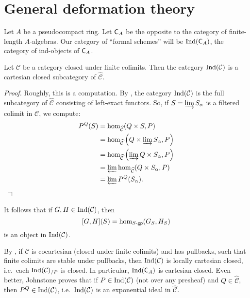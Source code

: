 \documentclass[phd,cornellheadings,draft]{cornell}
\begin{document}
\section{General deformation theory}

Let $A$ be a pseudocompact ring. Let $\mathsf{C}_A$ be the opposite to the 
category of finite-length $A$-algebras. Our category of ``formal schemes'' will 
be $\operatorname{Ind}(\mathsf{C}_A)$, the category of ind-objects of $\mathsf{C}_A$. 

\begin{theorem}
Let $\mathcal C$ be a category closed under finite colimits. Then the category 
$\operatorname{Ind}(\mathcal C)$ is a cartesian closed subcategory of 
$\widehat{\mathcal C}$. 
\end{theorem}
\begin{proof}
Roughly, this is a computation. By \cite[6.1.7]{kashiwara-schapira-2006}, the 
category $\operatorname{Ind}(\mathcal C)$ is the full subcategory of $\widehat{\mathcal C}$ 
consisting of left-exact functors. So, if $S=\varinjlim S_\alpha$ is a filtered 
colimit in $\mathcal C$, we compute:
\begin{align*}
	P^Q(S)
		&= \hom_{\widehat{\mathcal C}}(Q\times S,P) \\
		&= \hom_{\widehat{\mathcal C}}\left(Q\times \varinjlim S_\alpha,P\right) \\
		&= \hom_{\widehat{\mathcal C}}\left(\varinjlim Q\times S_\alpha,P\right) \\
		&= \varprojlim\hom_{\widehat{\mathcal C}}(Q\times S_\alpha,P) \\
		&= \varprojlim P^Q(S_\alpha) .
\end{align*}
\end{proof}

It follows that if $G,H\in \operatorname{Ind}(\mathcal C)$, then 
\[
  [G,H](S) = \hom_{S\textnormal{-}\mathsf{gp}}(G_S,H_S) 
\]
is an object in $\operatorname{Ind}(\mathcal C)$. 

By \cite[C 4.2.3]{johnstone-2002}, if $\mathcal C$ is cocartesian (closed under finite 
colimits) and has pullbacks, such that finite colimits are stable under pullbacks, 
then $\operatorname{Ind}(\mathcal C)$ is locally cartesian closed, i.e.~each 
$\operatorname{Ind}(\mathcal C)_{/P}$ is closed. In particular, 
$\operatorname{Ind}(\mathsf{C}_A)$ is cartesian closed. Even better, Johnstone proves that 
if $P\in \operatorname{Ind}(\mathcal C)$ (not over any presheaf) and $Q\in \widehat{\mathcal C}$,
then $P^Q\in\operatorname{Ind}(\mathcal C)$, i.e.~$\operatorname{Ind}(\mathcal C)$ is an exponential 
ideal in $\widehat{\mathcal C}$. 
\end{document}
